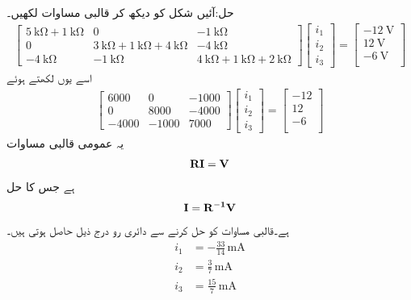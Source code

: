 حل:آئیں شکل کو دیکھ کر قالبی مساوات لکھیں۔
\begin{align*}
\begin{bmatrix}
\SI{5}{\kilo\ohm}+\SI{1}{\kilo\ohm} & 0 & -\SI{1}{\kilo\ohm}\\
0 & \SI{3}{\kilo\ohm}+\SI{1}{\kilo\ohm}+\SI{4}{\kilo\ohm}&-\SI{4}{\kilo\ohm}\\
-\SI{4}{\kilo\ohm}&-\SI{1}{\kilo\ohm}&\SI{4}{\kilo\ohm}+\SI{1}{\kilo\ohm}+\SI{2}{\kilo\ohm}
\end{bmatrix}
\begin{bmatrix}
i_1\\
i_2\\
i_3
\end{bmatrix}
=
\begin{bmatrix}
-\SI{12}{\volt}\\
\SI{12}{\volt}\\
-\SI{6}{\volt}\\
\end{bmatrix}
\end{align*}
اسے یوں لکھتے ہوئے
\begin{align*}
\begin{bmatrix}
6000& 0 & -1000\\
0 &8000&-4000\\
-4000&-1000&7000
\end{bmatrix}
\begin{bmatrix}
i_1\\
i_2\\
i_3
\end{bmatrix}
=
\begin{bmatrix}
-12\\
12\\
-6\\
\end{bmatrix}
\end{align*}
یہ عمومی قالبی مساوات
\begin{align*}
{\bf{R I}}={\bf{V}}
\end{align*}
ہے جس کا حل
\begin{align*}
{\bf{I}}={\bf{R^{-1}V}}
\end{align*}
ہے۔قالبی مساوات کو حل کرنے سے دائری رو درج ذیل حاصل ہوتی ہیں۔
\begin{align*}
i_1&=-\frac{33}{14} \, \si{\milli\ampere}\\
i_2&=\frac{3}{7} \, \si{\milli\ampere}\\
i_3&=\frac{15}{7} \, \si{\milli\ampere}
\end{align*}

